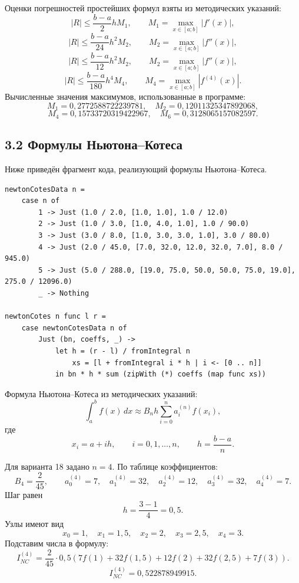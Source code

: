 \documentclass[14pt,a4paper]{extarticle}
\begin{document}
Оценки погрешностей простейших формул взяты из методических указаний:
\[
    |R|\leq \frac{b-a}{2}hM_1,
    \qquad M_1=\max_{x\in[a;b]}|f'(x)|,
\]
\[
    |R|\leq \frac{b-a}{24}h^2M_2,
    \qquad M_2=\max_{x\in[a;b]}|f''(x)|,
\]
\[
    |R|\leq \frac{b-a}{12}h^2M_2,
    \qquad M_2=\max_{x\in[a;b]}|f''(x)|,
\]
\[
    |R|\leq \frac{b-a}{180}h^4M_4,
    \qquad M_4=\max_{x\in[a;b]}|f^{(4)}(x)|.
\]
Вычисленные значения максимумов, использованные в программе:
\[
    M_1=0{,}2772588722239781,\quad
    M_2=0{,}12011325347892068,
\]
\[
    M_4=0{,}15733720319422967,\quad
    M_6=0{,}3128065157082597.
\]

\subsection*{3.2 Формулы Ньютона--Котеса}
Ниже приведён фрагмент кода, реализующий формулы Ньютона--Котеса.

\begin{lstlisting}[caption={Фрагмент кода формул Ньютона--Котеса}]
newtonCotesData n =
    case n of
        1 -> Just (1.0 / 2.0, [1.0, 1.0], 1.0 / 12.0)
        2 -> Just (1.0 / 3.0, [1.0, 4.0, 1.0], 1.0 / 90.0)
        3 -> Just (3.0 / 8.0, [1.0, 3.0, 3.0, 1.0], 3.0 / 80.0)
        4 -> Just (2.0 / 45.0, [7.0, 32.0, 12.0, 32.0, 7.0], 8.0 / 945.0)
        5 -> Just (5.0 / 288.0, [19.0, 75.0, 50.0, 50.0, 75.0, 19.0], 275.0 / 12096.0)
        _ -> Nothing

newtonCotes n func l r =
    case newtonCotesData n of
        Just (bn, coeffs, _) ->
            let h = (r - l) / fromIntegral n
                xs = [l + fromIntegral i * h | i <- [0 .. n]]
            in bn * h * sum (zipWith (*) coeffs (map func xs))
\end{lstlisting}

Формула Ньютона--Котеса из методических указаний:
\[
    \int_a^b f(x)\,dx \approx B_nh\sum_{i=0}^{n}a_i^{(n)}f(x_i),
\]
где
\[
    x_i=a+ih,\qquad i=0,1,\ldots,n,
    \qquad h=\frac{b-a}{n}.
\]

Для варианта 18 задано $n=4$. По таблице коэффициентов:
\[
    B_4=\frac{2}{45},\qquad
    a_0^{(4)}=7,
    \quad a_1^{(4)}=32,
    \quad a_2^{(4)}=12,
    \quad a_3^{(4)}=32,
    \quad a_4^{(4)}=7.
\]
Шаг равен
\[
    h=\frac{3-1}{4}=0{,}5.
\]
Узлы имеют вид
\[
    x_0=1,\quad x_1=1{,}5,\quad x_2=2,\quad x_3=2{,}5,\quad x_4=3.
\]
Подставим числа в формулу:
\[
    I_{NC}^{(4)}=\frac{2}{45}\cdot0{,}5\left(
    7f(1)+32f(1{,}5)+12f(2)+32f(2{,}5)+7f(3)
    \right).
\]
\[
    I_{NC}^{(4)}=0{,}522878949915.
\]
\end{document}
